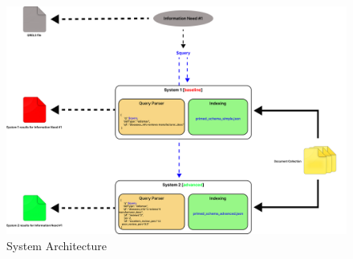 \documentclass[sigconf]{acmart}
\begin{document}
\begin{figure}[H]
	\centering
	\includegraphics[width=\linewidth]{system_arch.png}
	\caption{System Architecture}
	\label{fig:sysArchitecture}
  \end{figure}





\end{document}
